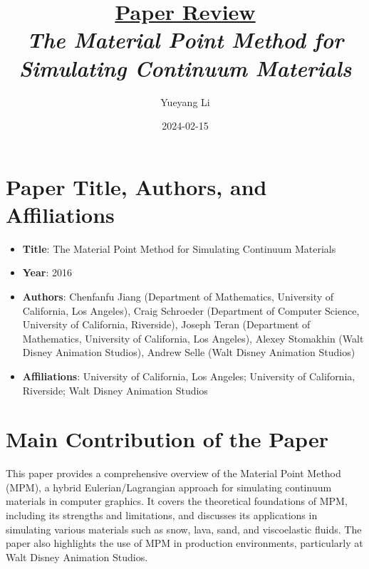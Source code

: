 \documentclass[12pt]{article}
\newcommand{\paperTitle}{
    \textit{\normalsize{The Material Point Method for Simulating Continuum Materials}}  
}
\begin{document}
\title{\Large\uline{\textbf{Paper Review}} \\[0.4em]
\paperTitle{} 
}
\author{Yueyang Li}
\date{2024-02-15}

\maketitle

\section{Paper Title, Authors, and Affiliations}
\begin{itemize}[noitemsep]
    \item \textbf{Title}: The Material Point Method for Simulating Continuum Materials
    \item \textbf{Year}: 2016
    \item \textbf{Authors}: Chenfanfu Jiang (Department of Mathematics, University of California, Los Angeles), Craig Schroeder (Department of Computer Science, University of California, Riverside), Joseph Teran (Department of Mathematics, University of California, Los Angeles), Alexey Stomakhin (Walt Disney Animation Studios), Andrew Selle (Walt Disney Animation Studios)
    \item \textbf{Affiliations}: University of California, Los Angeles; University of California, Riverside; Walt Disney Animation Studios
\end{itemize}

\section{Main Contribution of the Paper}
This paper provides a comprehensive overview of the Material Point Method (MPM), a hybrid Eulerian/Lagrangian approach for simulating continuum materials in computer graphics. It covers the theoretical foundations of MPM, including its strengths and limitations, and discusses its applications in simulating various materials such as snow, lava, sand, and viscoelastic fluids. The paper also highlights the use of MPM in production environments, particularly at Walt Disney Animation Studios.
\end{document}
